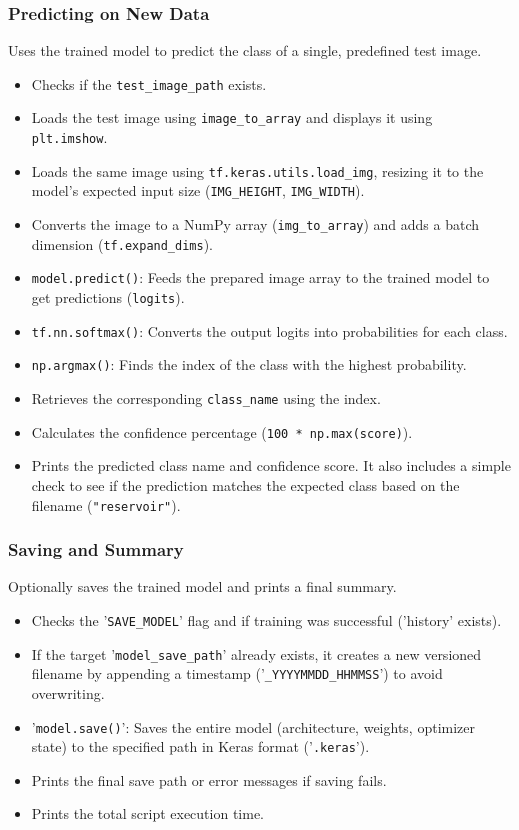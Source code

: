 \subsubsection{Predicting on New Data}
Uses the trained model to predict the class of a single, predefined test image.
\begin{itemize}
    \item Checks if the \verb|test_image_path| exists.
    \item Loads the test image using \verb|image_to_array| and displays it using \texttt{plt.imshow}.
    \item Loads the same image using \verb|tf.keras.utils.load_img|, resizing it to the model's expected input size (\verb|IMG_HEIGHT|, \verb|IMG_WIDTH|).
    \item Converts the image to a NumPy array (\verb|img_to_array|) and adds a batch dimension (\verb|tf.expand_dims|).
    \item \verb|model.predict()|: Feeds the prepared image array to the trained model to get predictions (\verb|logits|).
    \item \texttt{tf.nn.softmax()}: Converts the output logits into probabilities for each class.
    \item \texttt{np.argmax()}: Finds the index of the class with the highest probability.
    \item Retrieves the corresponding \verb|class_name| using the index.
    \item Calculates the confidence percentage (\texttt{100 * np.max(score)}).
    \item Prints the predicted class name and confidence score. It also includes a simple check to see if the prediction matches the expected class based on the filename (\texttt{"reservoir"}).
\end{itemize}

\subsubsection{Saving and Summary}
Optionally saves the trained model and prints a final summary.
\begin{itemize}
    \item Checks the '\verb|SAVE_MODEL|' flag and if training was successful ('history' exists).
    \item If the target '\verb|model_save_path|' already exists, it creates a new versioned filename by appending a timestamp ('\verb|_YYYYMMDD_HHMMSS|') to avoid overwriting.
    \item '\verb|model.save()|': Saves the entire model (architecture, weights, optimizer state) to the specified path in Keras format ('\verb|.keras|').
    \item Prints the final save path or error messages if saving fails.
    \item Prints the total script execution time.
\end{itemize}

